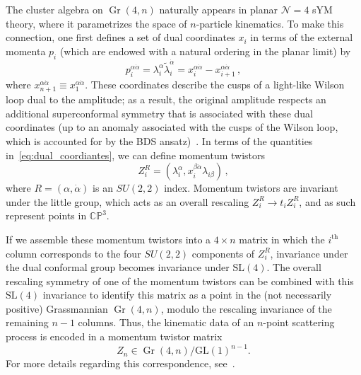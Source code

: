 \documentclass[12pt]{article}
\DeclareMathOperator{\Gr}{Gr}
\begin{document}

The cluster algebra on $\Gr(4,n)$ naturally appears in planar $\mathcal{N}=4$ sYM theory, where it parametrizes the space of $n$-particle kinematics. To make this connection, one first defines a set of dual coordinates $x_i$ in terms of the external momenta $p_i$ (which are endowed with a natural ordering in the planar limit) by
\begin{equation}
p_i^{\alpha \dot \alpha} = \lambda_i^\alpha \tilde \lambda_i^{\dot \alpha} = x_i^{\alpha \dot \alpha} - x_{i+1}^{\alpha \dot \alpha} \, , \label{eq:dual_coordiantes}
\end{equation}
where $x_{n+1}^{\alpha \dot \alpha} \equiv x_1^{\alpha \dot \alpha}$. These coordinates describe the cusps of a light-like Wilson loop dual to the amplitude; as a result, the original amplitude respects an additional superconformal symmetry that is associated with these dual coordinates (up to an anomaly associated with the cusps of the Wilson loop, which is accounted for by the BDS ansatz)~\cite{Bern:2005iz,Drummond:2007au,Bern:2008ap,Drummond:2008aq,Drummond:2006rz,Bern:2006ew,Bern:2007ct,Alday:2007hr,Drummond:2008vq}. In terms of the quantities in~\eqref{eq:dual_coordiantes}, we can define momentum twistors 
\begin{equation}
Z^R_i = (\lambda_i^\alpha, x_i^{\beta \dot \alpha} \lambda_{i \beta}) \, ,
\end{equation}
where $R = (\alpha, \dot \alpha)$ is an $SU(2,2)$ index. Momentum twistors are invariant under the little group, which acts as an overall rescaling $Z_i^R \rightarrow  t_i Z_i^R$, and as such represent points in $\mathbb{CP}^3$. 

If we assemble these momentum twistors into a $4 \times n$ matrix in which the $i^\text{th}$ column corresponds to the four $SU(2,2)$ components of $Z_i^R$, invariance under the dual conformal group becomes invariance under $\text{SL}(4)$. The overall rescaling symmetry of one of the momentum twistors can be combined with this $\text{SL}(4)$ invariance to identify this matrix as a point in the (not necessarily positive) Grassmannian $\Gr(4,n)$, modulo the rescaling invariance of the remaining $n-1$ columns. Thus, the kinematic data of an $n$-point scattering process is encoded in a momentum twistor matrix
\begin{equation}
Z_n \in \Gr(4,n)/\text{GL}(1)^{n-1}. \label{eq:gr4n_momentum_twistor}
\end{equation}
For more details regarding this correspondence, see~\cite{ArkaniHamed:2012nw,Golden:2013xva}. 
\end{document}
